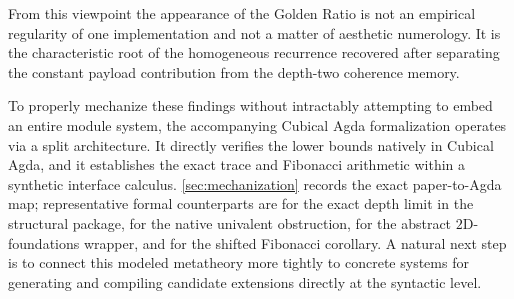 \documentclass{lmcs}
\begin{document}
From this viewpoint the appearance of the Golden Ratio is not an empirical regularity of one implementation and not a matter of aesthetic numerology. It is the characteristic root of the homogeneous recurrence recovered after separating the constant payload contribution from the depth-two coherence memory.

To properly mechanize these findings without intractably attempting to embed an entire module system, the accompanying Cubical Agda formalization operates via a split architecture. It directly verifies the lower bounds natively in Cubical Agda, and it establishes the exact trace and Fibonacci arithmetic within a synthetic interface calculus. \autoref{sec:mechanization} records the exact paper-to-Agda map; representative formal counterparts are  for the exact depth limit in the structural package,  for the native univalent obstruction,  for the abstract $2$D-foundations wrapper, and  for the shifted Fibonacci corollary. A natural next step is to connect this modeled metatheory more tightly to concrete systems for generating and compiling candidate extensions directly at the syntactic level.



\end{document}
